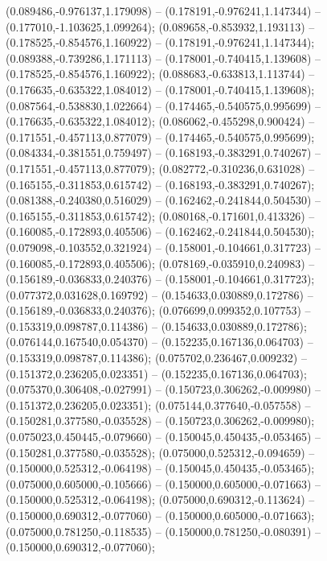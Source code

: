  (0.089486,-0.976137,1.179098) -- (0.178191,-0.976241,1.147344) -- (0.177010,-1.103625,1.099264);
 (0.089658,-0.853932,1.193113) -- (0.178525,-0.854576,1.160922) -- (0.178191,-0.976241,1.147344);
 (0.089388,-0.739286,1.171113) -- (0.178001,-0.740415,1.139608) -- (0.178525,-0.854576,1.160922);
 (0.088683,-0.633813,1.113744) -- (0.176635,-0.635322,1.084012) -- (0.178001,-0.740415,1.139608);
 (0.087564,-0.538830,1.022664) -- (0.174465,-0.540575,0.995699) -- (0.176635,-0.635322,1.084012);
 (0.086062,-0.455298,0.900424) -- (0.171551,-0.457113,0.877079) -- (0.174465,-0.540575,0.995699);
 (0.084334,-0.381551,0.759497) -- (0.168193,-0.383291,0.740267) -- (0.171551,-0.457113,0.877079);
 (0.082772,-0.310236,0.631028) -- (0.165155,-0.311853,0.615742) -- (0.168193,-0.383291,0.740267);
 (0.081388,-0.240380,0.516029) -- (0.162462,-0.241844,0.504530) -- (0.165155,-0.311853,0.615742);
 (0.080168,-0.171601,0.413326) -- (0.160085,-0.172893,0.405506) -- (0.162462,-0.241844,0.504530);
 (0.079098,-0.103552,0.321924) -- (0.158001,-0.104661,0.317723) -- (0.160085,-0.172893,0.405506);
 (0.078169,-0.035910,0.240983) -- (0.156189,-0.036833,0.240376) -- (0.158001,-0.104661,0.317723);
 (0.077372,0.031628,0.169792) -- (0.154633,0.030889,0.172786) -- (0.156189,-0.036833,0.240376);
 (0.076699,0.099352,0.107753) -- (0.153319,0.098787,0.114386) -- (0.154633,0.030889,0.172786);
 (0.076144,0.167540,0.054370) -- (0.152235,0.167136,0.064703) -- (0.153319,0.098787,0.114386);
 (0.075702,0.236467,0.009232) -- (0.151372,0.236205,0.023351) -- (0.152235,0.167136,0.064703);
 (0.075370,0.306408,-0.027991) -- (0.150723,0.306262,-0.009980) -- (0.151372,0.236205,0.023351);
 (0.075144,0.377640,-0.057558) -- (0.150281,0.377580,-0.035528) -- (0.150723,0.306262,-0.009980);
 (0.075023,0.450445,-0.079660) -- (0.150045,0.450435,-0.053465) -- (0.150281,0.377580,-0.035528);
 (0.075000,0.525312,-0.094659) -- (0.150000,0.525312,-0.064198) -- (0.150045,0.450435,-0.053465);
 (0.075000,0.605000,-0.105666) -- (0.150000,0.605000,-0.071663) -- (0.150000,0.525312,-0.064198);
 (0.075000,0.690312,-0.113624) -- (0.150000,0.690312,-0.077060) -- (0.150000,0.605000,-0.071663);
 (0.075000,0.781250,-0.118535) -- (0.150000,0.781250,-0.080391) -- (0.150000,0.690312,-0.077060);
